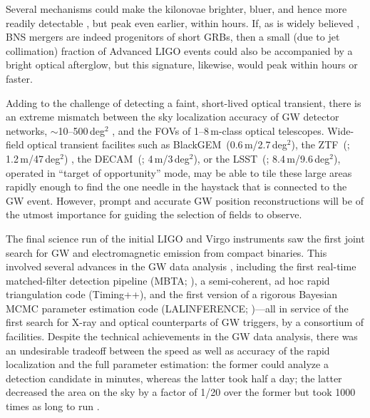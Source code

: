 \documentclass[amsmath,amssymb,aps,prx,reprint,nopreprintnumbers,nofootinbib]{revtex4-1}
\begin{document}
Several mechanisms could make the kilonovae brighter, bluer, and hence more readily detectable \citep{KilonovaPrecursor,KilonovaRedOrBlue}, but peak even earlier, within hours. If, as is widely believed \citep{1986ApJ...308L..43P,1989Natur.340..126E,1992ApJ...395L..83N,2011ApJ...732L...6R}, \ac{BNS} mergers are indeed progenitors of short \acp{GRB}, then a small (due to jet collimation) fraction of Advanced \ac{LIGO} events could also be accompanied by a bright optical afterglow, but this signature, likewise, would peak within hours or faster.

Adding to the challenge of detecting a faint, short-lived optical transient, there is an extreme mismatch between the sky localization accuracy of \ac{GW} detector networks, $\sim$10\nobreakdashes--500\,deg$^2$ \citep{FairhurstTriangulation,WenLocalizationAdvancedLIGO,FairhurstLocalizationAdvancedLIGO,2011PhRvD..84j4020V,RodriguezBasicParameterEstimation,NissankeLocalization,NissankeKasliwalEMCounterparts,KasliwalTwoDetectors,Grover:2013,SiderySkyLocalizationComparison,FirstTwoYears}, and the \acp{FOV} of 1\nobreakdashes--8\,m\nobreakdashes-class optical telescopes. Wide\nobreakdashes-field optical transient facilites such as BlackGEM~(0.6\,m/2.7\,deg$^2$), the \acl{ZTF}~(; 1.2\,m/47\,deg$^2$) \cite{ZTF}, the \acl{DECAM}~(; 4\,m/3\,deg$^2$), or the \acl{LSST}~(; 8.4\,m/9.6\,deg$^2$), operated in ``target of opportunity'' mode, may be able to tile these large areas rapidly enough to find the one needle in the haystack that is connected to the \ac{GW} event. However, prompt and accurate \ac{GW} position reconstructions will be of the utmost importance for guiding the selection of fields to observe.

The final science run of the initial LIGO and Virgo instruments saw the first joint search for \ac{GW} and electromagnetic emission from compact binaries. This involved several advances in the \ac{GW} data analysis \citep{CBCLowLatency}, including the first real\nobreakdashes-time matched\nobreakdashes-filter detection pipeline (\acs{MBTA}; ), a semi\nobreakdashes-coherent, ad hoc rapid triangulation code (Timing++), and the first version of a rigorous Bayesian \ac{MCMC} parameter estimation code (LALINFERENCE; \citealt{S6PE})---all in service of the first search for X\nobreakdashes-ray \citep{SwiftFollowup} and optical \citep{OpticalImageAnalysis} counterparts of \ac{GW} triggers, by a consortium of facilities. Despite the technical achievements in the \ac{GW} data analysis, there was an undesirable tradeoff between the speed as well as accuracy of the rapid localization and the full parameter estimation: the former could analyze a detection candidate in minutes, whereas the latter took half a day; the latter decreased the area on the sky by a factor of 1/20 over the former but took 1000 times as long to run \cite{SiderySkyLocalizationComparison}.
\end{document}
